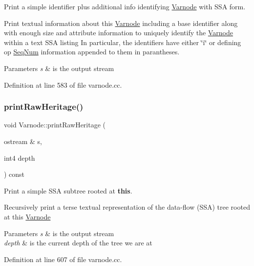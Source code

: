 Print a simple identifier plus additional info identifying \mbox{\hyperlink{class_varnode}{Varnode}} with S\+SA form. 

Print textual information about this \mbox{\hyperlink{class_varnode}{Varnode}} including a base identifier along with enough size and attribute information to uniquely identify the \mbox{\hyperlink{class_varnode}{Varnode}} within a text S\+SA listing In particular, the identifiers have either \char`\"{}i\char`\"{} or defining op \mbox{\hyperlink{class_seq_num}{Seq\+Num}} information appended to them in parantheses. 
\begin{DoxyParams}{Parameters}
{\em s} & is the output stream \\
\hline
\end{DoxyParams}


Definition at line 583 of file varnode.\+cc.

\mbox{\label{class_varnode_ae14d6bd40ea442939aecc888d7fcaa39}} 
\subsubsection{\texorpdfstring{printRawHeritage()}{printRawHeritage()}}
{\footnotesize\ttfamily void Varnode\+::print\+Raw\+Heritage (\begin{DoxyParamCaption}\item[{ostream \&}]{s,  }\item[{int4}]{depth }\end{DoxyParamCaption}) const}



Print a simple S\+SA subtree rooted at {\bfseries{this}}. 

Recursively print a terse textual representation of the data-\/flow (S\+SA) tree rooted at this \mbox{\hyperlink{class_varnode}{Varnode}} 
\begin{DoxyParams}{Parameters}
{\em s} & is the output stream \\
\hline
{\em depth} & is the current depth of the tree we are at \\
\hline
\end{DoxyParams}


Definition at line 607 of file varnode.\+cc.

\mbox{\label{class_varnode_aa90c838f1e0116747e09e3d1fe72b18e}} 

